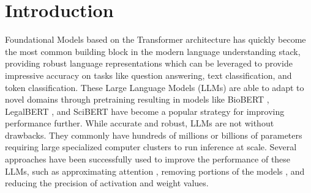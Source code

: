 \documentclass[10pt]{article}
\begin{document}
\section{Introduction}
Foundational Models \cite{Bommasani2021OnTO} based on the Transformer architecture \cite{Vaswani2017AttentionIA} has quickly become the most common building block in the modern language understanding stack, 
providing robust language representations which can be leveraged to provide impressive accuracy on tasks like question answering, text classification, and token classification. These Large Language Models (LLMs) are able to adapt to novel domains through pretraining resulting in models like BioBERT \cite{Lee2020BioBERTAP}, LegalBERT \cite{Chalkidis2020LEGALBERTTM}, and SciBERT \cite{beltagy2019SciBERTAP} have become a popular strategy for improving performance further. While accurate and robust, LLMs are not without drawbacks. 
They commonly have hundreds of millions or billions of parameters requiring large specialized computer clusters to run inference at scale. Several approaches have been successfully used to improve the performance of these LLMs, such as approximating attention \cite{Peng2021RandomFA}, removing portions of the models \cite{Sridhar2020UndividedAA}, and reducing the precision of activation and weight values.\\
\end{document}
